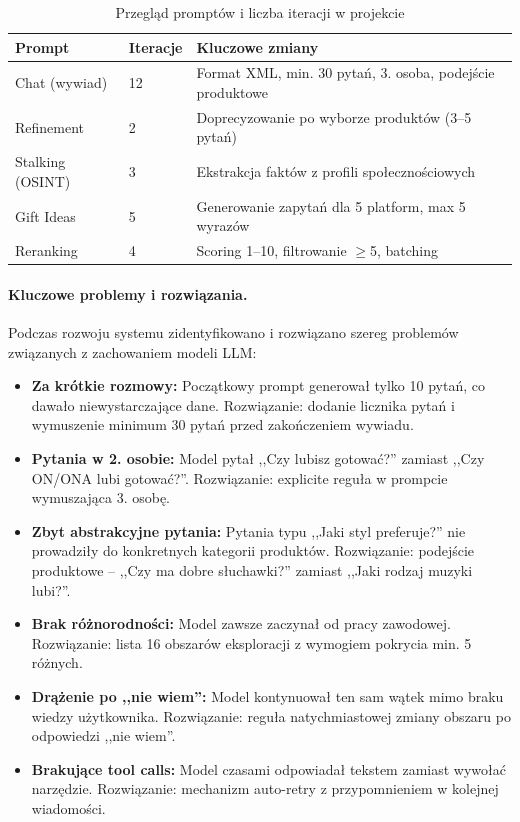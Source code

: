 \documentclass[12pt,a4paper]{article}
\begin{document}
\begin{table}[h]
\centering
\begin{tabular}{|p{}|p{}|p{}|}
\hline
\textbf{Prompt} & \textbf{Iteracje} & \textbf{Kluczowe zmiany} \\
\hline
Chat (wywiad) & 12 & Format XML, min. 30 pytań, 3. osoba, podejście produktowe \\
\hline
Refinement & 2 & Doprecyzowanie po wyborze produktów (3--5 pytań) \\
\hline
Stalking (OSINT) & 3 & Ekstrakcja faktów z profili społecznościowych \\
\hline
Gift Ideas & 5 & Generowanie zapytań dla 5 platform, max 5 wyrazów \\
\hline
Reranking & 4 & Scoring 1--10, filtrowanie $\geq$5, batching \\
\hline
\end{tabular}
\caption{Przegląd promptów i liczba iteracji w projekcie}
\label{tab:prompt-iterations}
\end{table}

\paragraph{Kluczowe problemy i rozwiązania.}
Podczas rozwoju systemu zidentyfikowano i rozwiązano szereg problemów związanych z zachowaniem modeli LLM:

\begin{itemize}
    \item \textbf{Za krótkie rozmowy:} Początkowy prompt generował tylko 10 pytań, co dawało niewystarczające dane. Rozwiązanie: dodanie licznika pytań i wymuszenie minimum 30 pytań przed zakończeniem wywiadu.
    \item \textbf{Pytania w 2. osobie:} Model pytał ,,Czy lubisz gotować?'' zamiast ,,Czy ON/ONA lubi gotować?''. Rozwiązanie: explicite reguła w prompcie wymuszająca 3. osobę.
    \item \textbf{Zbyt abstrakcyjne pytania:} Pytania typu ,,Jaki styl preferuje?'' nie prowadziły do konkretnych kategorii produktów. Rozwiązanie: podejście produktowe -- ,,Czy ma dobre słuchawki?'' zamiast ,,Jaki rodzaj muzyki lubi?''.
    \item \textbf{Brak różnorodności:} Model zawsze zaczynał od pracy zawodowej. Rozwiązanie: lista 16 obszarów eksploracji z wymogiem pokrycia min. 5 różnych.
    \item \textbf{Drążenie po ,,nie wiem'':} Model kontynuował ten sam wątek mimo braku wiedzy użytkownika. Rozwiązanie: reguła natychmiastowej zmiany obszaru po odpowiedzi ,,nie wiem''.
    \item \textbf{Brakujące tool calls:} Model czasami odpowiadał tekstem zamiast wywołać narzędzie. Rozwiązanie: mechanizm auto-retry z przypomnieniem w kolejnej wiadomości.
\end{itemize}
\end{document}
